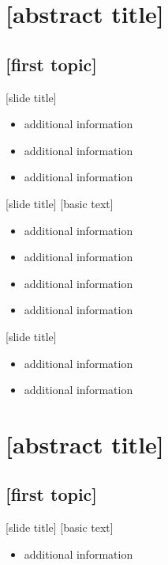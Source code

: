 \documentclass{beamer}
\begin{document}
\section{[abstract title]}
\subsection{[first topic]}
\begin{frame}{[slide title]}
  \begin{itemize}
    \item<1-> additional information
    \item<2-> additional information
    \item<3-> additional information
  \end{itemize}
\end{frame}
\begin{frame}{[slide title]}
  [basic text]
  \pause
  \begin{itemize}
    \item<2-> additional information
    \item<3-> additional information
    \item<4-> additional information
    \item<5-> additional information
  \end{itemize}
\end{frame}
\begin{frame}{[slide title]}
  \begin{itemize}
    \item<1-> additional information
    \item<2-> additional information
  \end{itemize}
\end{frame}


\section{[abstract title]}
\subsection{[first topic]}
\begin{frame}{[slide title]}
  [basic text]
  \begin{itemize}
    \item<1-> additional information
  \end{itemize}
\end{frame}
\end{document}
